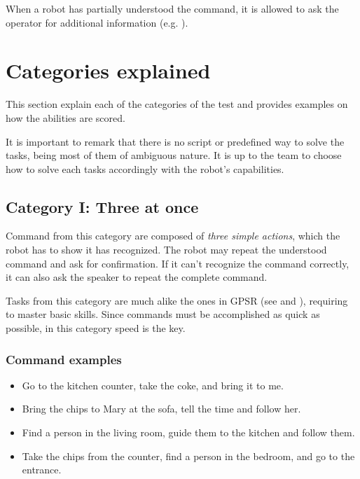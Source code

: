 When a robot has partially understood the command, it is allowed to ask the operator for additional information (e.g. \textit{}).

%
%
\section{Categories explained}
\label{sec:eegpsr-categories-explained}
This section explain each of the categories of the test and provides examples on how the abilities are scored.

It is important to remark that there is no script or predefined way to solve the tasks, being most of them of ambiguous nature. It is up to the team to choose how to solve each tasks accordingly with the robot's capabilities.



%
%
\subsection{Category I: Three at once}
\label{sec:eegpsr-category1-explained}
Command from this category are composed of \textit{three simple actions}, which the robot has to show it has recognized. The robot may repeat the understood command and ask for confirmation. If it can't recognize the command correctly, it can also ask the speaker to repeat the complete command.

Tasks from this category are much alike the ones in GPSR (see  and ), requiring to master basic skills. Since commands must be accomplished as quick as possible, in this category speed is the key.

\subsubsection{Command examples}
\begin{itemize}
	\item Go to the kitchen counter, take the coke, and bring it to me.
	\item Bring the chips to Mary at the sofa, tell the time and follow her.
	\item Find a person in the living room, guide them to the kitchen and follow them.
	\item Take the chips from the counter, find a person in the bedroom, and go to the entrance.
\end{itemize}


